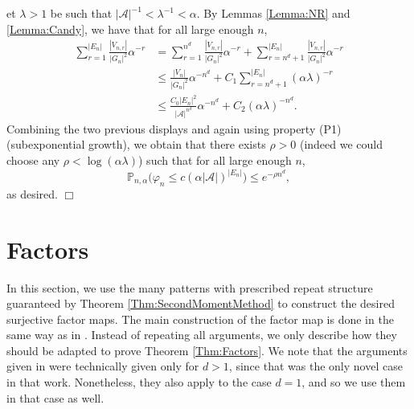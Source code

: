 \documentclass[12pt]{amsart}
\theoremstyle{definition}
\def\PP{\mathbb{P}_{n,\alpha}}
\newenvironment{ProofOfSecondMomentMethodThm}[1]
{\par\vskip2\parsep\noindent{\sc Proof of Theorem\ \ref{Thm:SecondMomentMethod}. }}{{\hfill
$\Box$}
\par\vskip2\parsep}
\begin{document}
\begin{ProofOfSecondMomentMethodThm}
Let $\lambda>1$ be such that $|\mathcal{A}|^{-1} < \lambda^{-1} < \alpha$.
By Lemmas \ref{Lemma:NR} and \ref{Lemma:Candy}, we have that for all large enough $n$, 
\begin{align*}
\sum_{r = 1}^{|E_n|} \frac{|V_{n,r}|}{|G_n|^2} \alpha^{-r} & = \sum_{r = 1}^{n^d} \frac{|V_{n,r}|}{|G_n|^2} \alpha^{-r} + \sum_{r = n^d+1}^{|E_n|} \frac{|V_{n,r}|}{|G_n|^2} \alpha^{-r}  \\
 & \leq \frac{|V_n|}{|G_n|^2} \alpha^{-n^d} + C_1 \sum_{r = n^d +1}^{|E_n|} (\alpha \lambda)^{-r} \\ 
 & \leq \frac{C_0 |E_n|^2}{ |\mathcal{A}|^{n^d}} \alpha^{-n^d} + C_2 (\alpha \lambda)^{-n^d}.
\end{align*}
Combining the two previous displays and again using property (P1) (subexponential growth), we obtain that there exists $\rho > 0$ (indeed we could choose any $\rho < \log(\alpha \lambda)$) such that for all large enough $n$,
\begin{equation*}
\PP \bigl( \varphi_n \leq c (\alpha |\mathcal{A}| )^{|E_n|} \bigr)  \leq e^{- \rho n^d},
\end{equation*}
as desired.
\end{ProofOfSecondMomentMethodThm}




\section{Factors} \label{Sect:Factors}

In this section, we use the many patterns with prescribed repeat structure guaranteed by Theorem \ref{Thm:SecondMomentMethod} to construct the desired surjective factor maps. %
The main construction of the factor map is done in the same way as in \cite{McGoffPavlov_factors}. 
Instead of repeating all arguments, we only describe how they should be adapted to prove Theorem \ref{Thm:Factors}. 
We note that the arguments given in \cite{McGoffPavlov_factors} were technically given only for $d > 1$, since that was the only novel case in that work. Nonetheless, they also apply to the case $d = 1$, and so we use them in that case as well.
\end{document}
